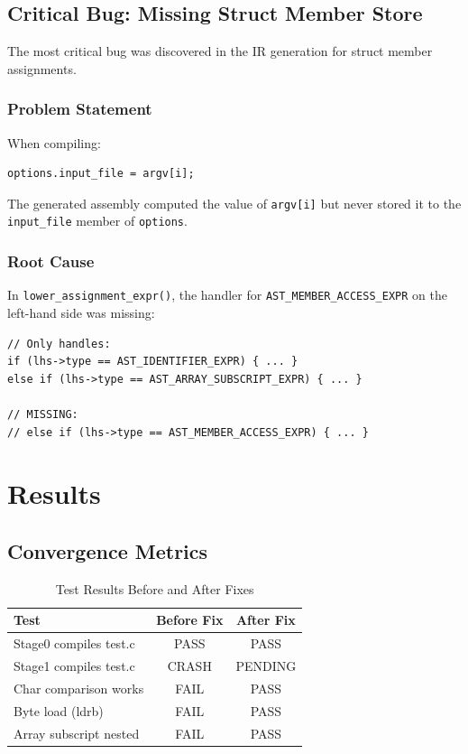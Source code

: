 \documentclass{article}
\begin{document}
\subsection{Critical Bug: Missing Struct Member Store}

The most critical bug was discovered in the IR generation for struct member assignments.

\subsubsection{Problem Statement}
When compiling:
\begin{verbatim}
options.input_file = argv[i];
\end{verbatim}

The generated assembly computed the value of \texttt{argv[i]} but never stored it to the \texttt{input\_file} member of \texttt{options}.

\subsubsection{Root Cause}
In \texttt{lower\_assignment\_expr()}, the handler for \texttt{AST\_MEMBER\_ACCESS\_EXPR} on the left-hand side was missing:

\begin{verbatim}
// Only handles:
if (lhs->type == AST_IDENTIFIER_EXPR) { ... }
else if (lhs->type == AST_ARRAY_SUBSCRIPT_EXPR) { ... }

// MISSING:
// else if (lhs->type == AST_MEMBER_ACCESS_EXPR) { ... }
\end{verbatim}

\section{Results}

\subsection{Convergence Metrics}

\begin{table}[h]
\centering
\begin{tabular}{lcc}
\toprule
\textbf{Test} & \textbf{Before Fix} & \textbf{After Fix} \\
\midrule
Stage0 compiles test.c & PASS & PASS \\
Stage1 compiles test.c & CRASH & PENDING \\
Char comparison works & FAIL & PASS \\
Byte load (ldrb) & FAIL & PASS \\
Array subscript nested & FAIL & PASS \\
\bottomrule
\end{tabular}
\caption{Test Results Before and After Fixes}
\end{table}
\end{document}
